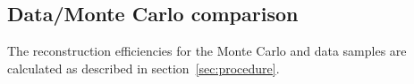 \documentclass[a4paper,11pt]{article}
\begin{document}




\subsection{Data/Monte Carlo comparison}\label{sec:datamc}
The reconstruction efficiencies for the Monte Carlo and data samples are calculated as described in section~\ref{sec:procedure}. %
\end{document}
